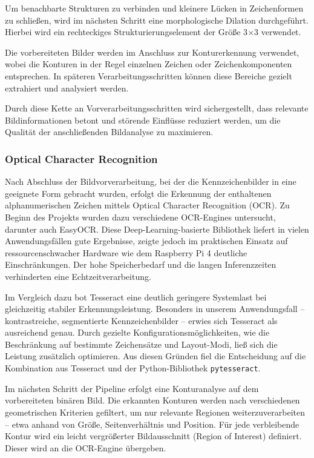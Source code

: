 Um benachbarte Strukturen zu verbinden und kleinere Lücken in Zeichenformen zu schließen, wird im nächsten Schritt eine morphologische Dilation durchgeführt. Hierbei wird ein rechteckiges Strukturierungselement der Größe 3$\times$3 verwendet.\singlespacing

Die vorbereiteten Bilder werden im Anschluss zur Konturerkennung verwendet, wobei die Konturen in der Regel einzelnen Zeichen oder Zeichenkomponenten entsprechen. In späteren Verarbeitungsschritten können diese Bereiche gezielt extrahiert und analysiert werden.\singlespacing

Durch diese Kette an Vorverarbeitungsschritten wird sichergestellt, dass relevante Bildinformationen betont und störende Einflüsse reduziert werden, um die Qualität der anschließenden Bildanalyse zu maximieren.


\subsubsection{Optical Character Recognition}

Nach Abschluss der Bildvorverarbeitung, bei der die Kennzeichenbilder in eine geeignete Form gebracht wurden, erfolgt die Erkennung der enthaltenen alphanumerischen Zeichen mittels Optical Character Recognition (OCR). Zu Beginn des Projekts wurden dazu verschiedene OCR-Engines untersucht, darunter auch EasyOCR. Diese Deep-Learning-basierte Bibliothek liefert in vielen Anwendungsfällen gute Ergebnisse, zeigte jedoch im praktischen Einsatz auf ressourcenschwacher Hardware wie dem Raspberry Pi 4 deutliche Einschränkungen. Der hohe Speicherbedarf und die langen Inferenzzeiten verhinderten eine Echtzeitverarbeitung.\singlespacing

Im Vergleich dazu bot Tesseract eine deutlich geringere Systemlast bei gleichzeitig stabiler Erkennungsleistung. Besonders in unserem Anwendungsfall – kontrastreiche, segmentierte Kennzeichenbilder – erwies sich Tesseract als ausreichend genau. Durch gezielte Konfigurationsmöglichkeiten, wie die Beschränkung auf bestimmte Zeichensätze und Layout-Modi, ließ sich die Leistung zusätzlich optimieren. Aus diesen Gründen fiel die Entscheidung auf die Kombination aus Tesseract und der Python-Bibliothek \texttt{pytesseract}.\singlespacing

Im nächsten Schritt der Pipeline erfolgt eine Konturanalyse auf dem vorbereiteten binären Bild. Die erkannten Konturen werden nach verschiedenen geometrischen Kriterien gefiltert, um nur relevante Regionen weiterzuverarbeiten – etwa anhand von Größe, Seitenverhältnis und Position. Für jede verbleibende Kontur wird ein leicht vergrößerter Bildausschnitt (Region of Interest) definiert. Dieser wird an die OCR-Engine übergeben.\singlespacing

